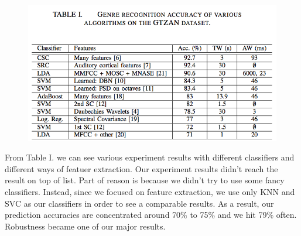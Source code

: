 \documentclass[final]{siamltexmm}
\begin{document}
\begin{figure}[ht]
  \begin{center}
    \includegraphics[scale=0.7]{../fig/refAccr.png}
  \end{center}
\end{figure}

From Table I. we can see various experiment results with different classifiers and different ways of featuer extraction.  Our experiment results didn't reach the result on top of list.  Part of reason is because we didn't try to use some fancy classifiers.  Instead, since we focused on feature extraction, we use only KNN and SVC as our classifiers in order to see a comparable results.  As a result, our prediction accuracies are concentrated around 70\% to 75\% and we hit 79\% often.  Robustness became one of our major results.
\end{document}
